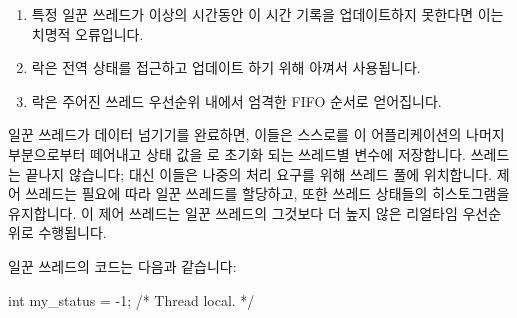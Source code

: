 {{	\fi

	\begin{enumerate}
	\item	특정 일꾼 쓰레드가  이상의 시간동안 이 시간
		기록을 업데이트하지 못한다면 이는 치명적 오류입니다.
	\item	락은 전역 상태를 접근하고 업데이트 하기 위해 아껴서 사용됩니다.
	\item	락은 주어진 쓰레드 우선순위 내에서 엄격한 FIFO 순서로
		얻어집니다.

	\iffalse

	\item	It is a fatal error for a given worker thread to fail
		to update its timestamp for a time period of more than
		\co{MAX_LOOP_TIME}.
	\item	Locks are used sparingly to access and update global
		state.
	\item	Locks are granted in strict FIFO order within
		a given thread priority.

	\fi

	\end{enumerate}

	일꾼 쓰레드가 데이터 넘기기를 완료하면, 이들은 스스로를 이
	어플리케이션의 나머지 부분으로부터 떼어내고 상태 값을  로 초기화
	되는 쓰레드별  변수에 저장합니다.
	쓰레드는 끝나지 않습니다; 대신 이들은 나중의 처리 요구를 위해 쓰레드
	풀에 위치합니다.
	제어 쓰레드는 필요에 따라 일꾼 쓰레드를 할당하고, 또한 쓰레드 상태들의
	히스토그램을 유지합니다.
	이 제어 쓰레드는 일꾼 쓰레드의 그것보다 더 높지 않은 리얼타임
	우선순위로 수행됩니다.

	일꾼 쓰레드의 코드는 다음과 같습니다:

	\iffalse

	When worker threads complete their feed, they must disentangle
	themselves from the rest of the application and place a status
	value in a per-thread \co{my_status} variable that is initialized
	to \co{-1}.
	Threads do not exit; they instead are placed on a thread pool
	to accommodate later processing requirements.
	The control thread assigns (and re-assigns) worker threads as
	needed, and also maintains a histogram of thread statuses.
	The control thread runs at a real-time priority no higher than
	that of the worker threads.

	Worker threads' code is as follows:

	\fi

\begin{VerbatimN}
	int my_status = -1;  /* Thread local. */


\end{VerbatimN}}}
